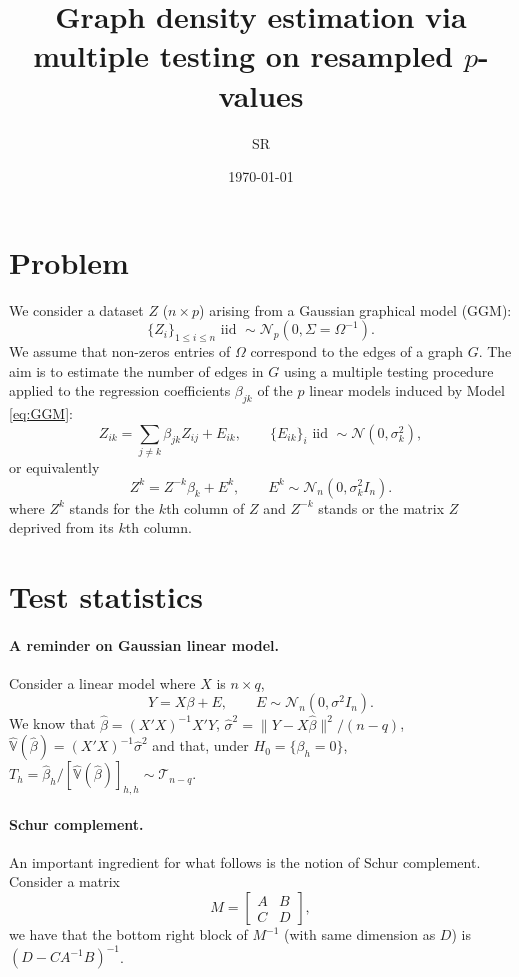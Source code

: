 \documentclass[a4paper, 10pt]{article}
\title{Graph density estimation via multiple testing on resampled $p$-values}
\author{SR}
\date{\today}
\begin{document}
\maketitle

\section{Problem} 
We consider a dataset $Z$ ($n \times p$) arising from a Gaussian graphical model (GGM):
\begin{equation} \label{eq:GGM}
\{Z_i\}_{1 \leq i \leq n} \text{ iid } \sim \mathcal{N}_p(0, \Sigma = \Omega^{-1}).
\end{equation}
We assume that non-zeros entries of $\Omega$ correspond to the edges of a graph $G$. The aim is to estimate the number of edges in $G$ using a multiple testing procedure applied to the regression coefficients $\beta_{jk}$ of the $p$ linear models induced by Model \eqref{eq:GGM}: 
$$
Z_{ik} = \sum_{j \neq k} \beta_{jk} Z_{ij} + E_{ik}, 
\qquad \{E_{ik}\}_i \text{ iid } \sim \mathcal{N}(0, \sigma^2_k),
$$
or equivalently
\begin{equation} \label{eq:LM}
Z^k = Z^{-k} \beta_k + E^k, 
\qquad E^k \sim \mathcal{N}_n(0, \sigma^2_k I_n).
\end{equation}
where $Z^k$ stands for the $k$th column of $Z$ and $Z^{-k}$ stands or the matrix $Z$ deprived from its $k$th column.

\section{Test statistics} 

\paragraph{A reminder on Gaussian linear model.}
Consider a linear model where $X$ is $n \times q$,
$$
Y = X \beta + E, 
\qquad E \sim \mathcal{N}_n(0, \sigma^2 I_n).
$$
We know that $\widehat{\beta} = (X' X)^{-1} X' Y$, $\widehat{\sigma}^2 = \|Y - X \widehat{\beta}\|^2 / (n-q)$, $\widehat{\mathbb{V}}(\widehat{\beta}) = (X' X)^{-1} \widehat{\sigma}^2$ and that, under $H_0 = \{\beta_h = 0\}$, 
$T_h = \widehat{\beta}_h / \left[\widehat{\mathbb{V}}(\widehat{\beta})\right]_{h, h} \sim \mathcal{T}_{n-q}$. 

\paragraph{Schur complement.} 
An important ingredient for what follows is the notion of Schur complement. Consider a matrix
$$
M = \left[\begin{array}{cc} A & B \\ C & D \end{array}\right],
$$
we have that the bottom right block of $M^{-1}$ (with same dimension as $D$) is 
$\left(D - C A^{-1} B\right)^{-1}$.
\end{document}
